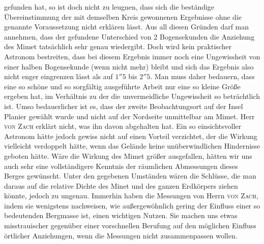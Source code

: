 gefunden hat, so ist doch nicht zu leugnen, dass sich die beständige Übereinstimmung der mit demselben Kreis gewonnenen Ergebnisse ohne die genannte Voraussetzung nicht erklären lässt. Aus all diesen Gründen darf man annehmen, dass der gefundene Unterschied von 2 Bogensekunden die Anziehung des Mimet tatsächlich sehr genau wiedergibt. Doch wird kein praktischer Astronom bestreiten, dass bei diesem Ergebnis immer noch eine Ungewissheit von einer halben Bogensekunde (wenn nicht mehr) bleibt und sich das Ergebnis also nicht enger eingrenzen lässt als auf $1''5$ bis $2''5$. Man muss daher bedauern, dass eine so schöne und so sorgfältig ausgeführte Arbeit nur eine so kleine Größe ergeben hat, im Verhältnis zu der die unvermeidliche Ungewissheit so beträchtlich ist. Umso bedauerlicher ist es, dass der zweite Beobachtungsort auf der Insel Planier gewählt wurde und nicht auf der Nordseite unmittelbar am Mimet. Herr \textsc{von Zach} erklärt nicht, was ihn davon abgehalten hat. Ein so einsichtsvoller Astronom hätte jedoch gewiss nicht auf einen Vorteil verzichtet, der die Wirkung vielleicht verdoppelt hätte, wenn das Gelände keine unüberwindlichen Hindernisse geboten hätte. Wäre die Wirkung des Mimet größer ausgefallen, hätten wir uns auch sehr eine vollständigere Kenntnis der räumlichen Abmessungen dieses Berges gewünscht. Unter den gegebenen Umständen wären die Schlüsse, die man daraus auf die relative Dichte des Minet und des ganzen Erdkörpers ziehen könnte, jedoch zu ungenau. Immerhin haben die Messungen von Herrn \textsc{von Zach}, indem sie wenigstens nachweisen, wie außergewöhnlich gering der Einfluss einer so bedeutenden Bergmasse ist, einen wichtigen Nutzen. Sie machen uns etwas misstrauischer gegenüber einer vorschnellen Berufung auf den möglichen Einfluss örtlicher Anziehungen, wenn die Messungen nicht zusammenpassen wollen.

